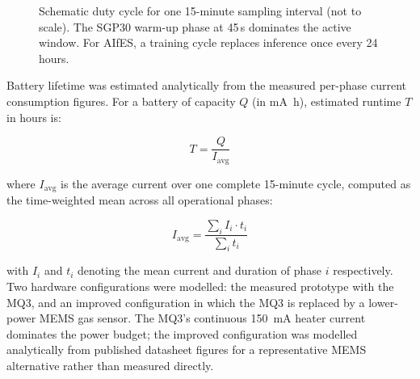 \begin{figure}[H]
\centering
{}
\caption{Schematic duty cycle for one 15-minute sampling interval (not to scale). The SGP30 warm-up phase at 45\,s dominates the active window. For AIfES, a training cycle replaces inference once every 24 hours.}
\label{fig:duty_cycle}
\end{figure}

Battery lifetime was estimated analytically from the measured per-phase current consumption figures. For a battery of capacity $Q$ (in \si{\milli\ampere\hour}), estimated runtime $T$ in hours is:

\begin{equation}
    T = \frac{Q}{I_{\text{avg}}}
    \label{eq:battery_lifetime}
\end{equation}

where $I_{\text{avg}}$ is the average current over one complete 15-minute cycle, computed as the time-weighted mean across all operational phases:

\begin{equation}
    I_{\text{avg}} = \frac{\displaystyle\sum_{i} I_i \cdot t_i}{\displaystyle\sum_{i} t_i}
    \label{eq:avg_current}
\end{equation}

with $I_i$ and $t_i$ denoting the mean current and duration of phase $i$ respectively. Two hardware configurations were modelled: the measured prototype with the MQ3, and an improved configuration in which the MQ3 is replaced by a lower-power MEMS gas sensor. The MQ3's continuous \SI{150}{\milli\ampere} heater current dominates the power budget; the improved configuration was modelled analytically from published datasheet figures for a representative MEMS alternative rather than measured directly.
